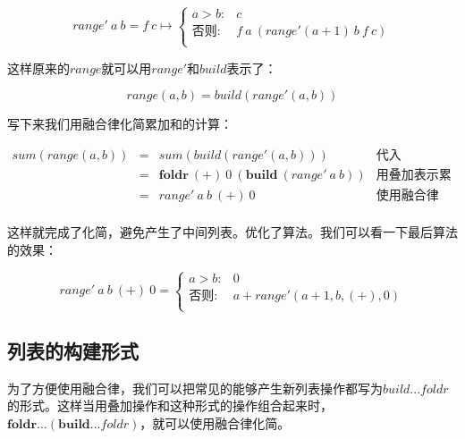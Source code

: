 \documentclass{article}
\begin{document}
\[
range'\ a\ b = f\ c \mapsto
  \begin{cases}
  a > b: & c \\
  \text{否则}: & f\ a\ (range' (a+1)\ b\ f\ c) \\
  \end{cases}
\]

这样原来的$range$就可以用$range'$和$build$表示了：

\[
range(a, b) = build(range'(a, b))
\]

写下来我们用融合律化简累加和的计算：

\[
\begin{array}{rcll}
sum(range(a, b)) & = & sum(build(range'(a, b))) & \text{代入} \\
  & = & \pmb{foldr}\ (+)\ 0\ (\pmb{build}\ (range'\ a\ b)) & \text{用叠加表示累加} \\
  & = & range'\ a\ b\ (+)\ 0 & \text{使用融合律} \\
\end{array}
\]

这样就完成了化简，避免产生了中间列表。优化了算法。我们可以看一下最后算法的效果：

\[
range'\ a\ b\ (+)\ 0 =
  \begin{cases}
  a > b: & 0 \\
  \text{否则}: & a + range'(a+1, b, (+), 0) \\
  \end{cases}
\]

\subsection{列表的构建形式}

为了方便使用融合律，我们可以把常见的能够产生新列表操作都写为$build...foldr$的形式。这样当用叠加操作和这种形式的操作组合起来时，$\pmb{foldr}...(\pmb{build}...foldr)$，就可以使用融合律化简。
\end{document}
